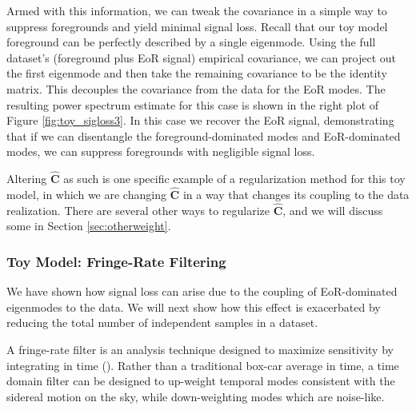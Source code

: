 \documentclass[preprint2,numberedappendix,tighten]{aastex6}  %
\begin{document}
Armed with this information,
we can tweak the covariance in a simple way to suppress foregrounds and yield minimal signal loss. Recall that our toy model foreground 
can be perfectly described by a single eigenmode. Using the full dataset's (foreground plus EoR signal) empirical covariance, we can 
project out the first eigenmode and 
then take the remaining covariance to be the identity matrix.  
This decouples the covariance from the data for the EoR modes.  The resulting power spectrum estimate for this case is shown in the right plot of Figure \ref{fig:toy_sigloss3}. 
In this case we recover the EoR signal, demonstrating that if we can disentangle the foreground-dominated modes and EoR-dominated modes, we can suppress
foregrounds with negligible signal loss. 

Altering $\widehat{\textbf{C}}$ as such is one specific example of a regularization method for this toy model, in which we are changing $\widehat{\textbf{C}}$ in a way that changes its coupling to the data realization. There are several other ways to regularize $\widehat{\textbf{C}}$, and we will discuss some in Section 
\ref{sec:otherweight}.

\subsubsection{Toy Model: Fringe-Rate Filtering}
\label{sec:toymodel_frf}

We have shown how signal loss can arise due to the coupling of EoR-dominated eigenmodes to the data. We will next show how this effect is exacerbated by reducing the total number of independent samples in a dataset. 

A fringe-rate filter is an analysis technique designed to maximize sensitivity by integrating in time (\citealt{parsons_et_al2016}). Rather than a traditional box-car average in time, a time domain filter can be designed to up-weight temporal modes consistent with the sidereal motion on the sky, while down-weighting modes which are noise-like. 
\end{document}
